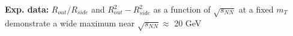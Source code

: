 \documentclass[dvipsnames] {beamer}
\begin{document}
\begin{frame}
\begin{columns}[t]
         
          
                 {\scriptsize 
                   \begin{block}{\bf \centering \scriptsize Exp. data:}
                     $R_{out} / R_{side}$ and $R_{out}^{2} - R_{side}^{2}$ as a function of
                     $\sqrt{s_{NN}}$ at a fixed $m_{T}$ demonstrate a wide maximum near
                     $\sqrt{s_{NN}} \approx$ 20 GeV
                   \end{block}
                 }
                 \vskip -0.4cm
\end{columns}
\end{frame}
\end{document}

